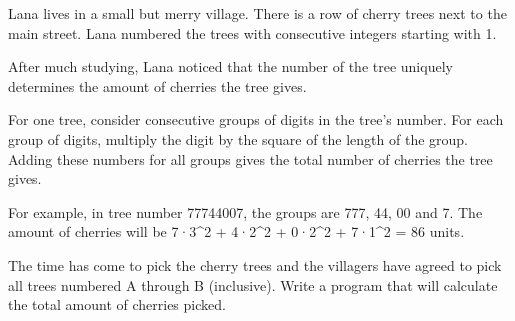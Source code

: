 Lana lives in a small but merry village. There is a row of cherry trees next to the main street. Lana numbered the trees with consecutive integers starting with 1.  

   After much studying, Lana noticed that the number of the tree uniquely determines the amount of cherries the tree gives.  

   For one tree, consider consecutive groups of digits in the tree's number. For each group of digits, multiply the digit by the square of the length of the group. Adding these numbers for all groups gives the total number of cherries the tree gives.  

   For example, in tree number 77744007, the groups are 777, 44, 00 and 7. The amount of cherries will be 7·3^2 + 4·2^2 + 0·2^2 + 7·1^2 = 86 units.  

   The time has come to pick the cherry trees and the villagers have agreed to pick all trees numbered A through B (inclusive). Write a program that will calculate the total amount of cherries picked.  

\
